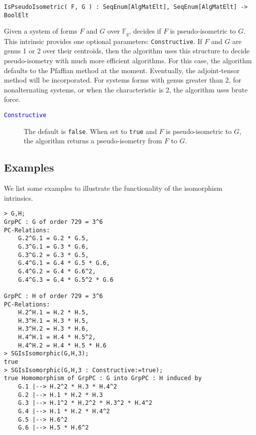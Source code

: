 \documentclass{amsart}
\begin{document}
\color{blue}
\begin{verbatim}
IsPseudoIsometric( F, G ) : SeqEnum[AlgMatElt], SeqEnum[AlgMatElt] -> BoolElt
\end{verbatim}

\color{black}
Given a system of forms $F$ and $G$ over $\mathbb{F}_q$, decides if $F$ is pseudo-isometric to $G$.
This intrinsic provides one optional parameters: {\tt Constructive}. 
If $F$ and $G$ are genus 1 or 2 over their centroids, then the algorithm uses this structure to decide pseudo-isometry with much more efficient algorithms.
For this case, the algorithm defaults to the Pfaffian method at the moment. 
Eventually, the adjoint-tensor method will be incorporated.
For systems forms with genus greater than 2, for nonalternating systems, or when the characteristic is 2, the algorithm uses brute force. 

\begin{description}
\item[\textcolor{blue}{\tt Constructive}]
The default is {\tt false}. 
When set to {\tt true} and $F$ is pseudo-isometric to $G$, the algorithm returns a pseudo-isometry from $F$ to $G$.
\end{description}


\subsection{Examples}
We list some examples to illustrate the functionality of the isomorphism intrinsics.

\begin{lstlisting}[frame=single,basicstyle=\ttfamily\color{black!30!teal},backgroundcolor=\color{white!70!gray}]
> G,H;
GrpPC : G of order 729 = 3^6
PC-Relations:
    G.2^G.1 = G.2 * G.5, 
    G.3^G.1 = G.3 * G.6, 
    G.3^G.2 = G.3 * G.5, 
    G.4^G.1 = G.4 * G.5 * G.6, 
    G.4^G.2 = G.4 * G.6^2, 
    G.4^G.3 = G.4 * G.5^2 * G.6

GrpPC : H of order 729 = 3^6
PC-Relations:
    H.2^H.1 = H.2 * H.5, 
    H.3^H.1 = H.3 * H.5, 
    H.3^H.2 = H.3 * H.6, 
    H.4^H.1 = H.4 * H.5^2, 
    H.4^H.2 = H.4 * H.5 * H.6
> SGIsIsomorphic(G,H,3);
true
> SGIsIsomorphic(G,H,3 : Constructive:=true);
true Homomorphism of GrpPC : G into GrpPC : H induced by
    G.1 |--> H.2^2 * H.3 * H.4^2
    G.2 |--> H.1 * H.2 * H.3
    G.3 |--> H.1^2 * H.2^2 * H.3^2 * H.4^2
    G.4 |--> H.1 * H.2 * H.4^2
    G.5 |--> H.6^2
    G.6 |--> H.5 * H.6^2
\end{lstlisting}
\end{document}
